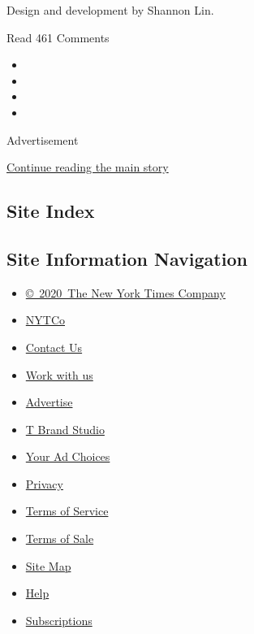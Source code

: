 Design and development by Shannon Lin.

Read 461 Comments

\begin{itemize}
\item
\item
\item
\item
\end{itemize}

Advertisement

\protect\hyperlink{after-bottom}{Continue reading the main story}

\hypertarget{site-index}{%
\subsection{Site Index}\label{site-index}}

\hypertarget{site-information-navigation}{%
\subsection{Site Information
Navigation}\label{site-information-navigation}}

\begin{itemize}
\tightlist
\item
  \href{https://help.nytimes.com/hc/en-us/articles/115014792127-Copyright-notice}{©~2020~The
  New York Times Company}
\end{itemize}

\begin{itemize}
\tightlist
\item
  \href{https://www.nytco.com/}{NYTCo}
\item
  \href{https://help.nytimes.com/hc/en-us/articles/115015385887-Contact-Us}{Contact
  Us}
\item
  \href{https://www.nytco.com/careers/}{Work with us}
\item
  \href{https://nytmediakit.com/}{Advertise}
\item
  \href{http://www.tbrandstudio.com/}{T Brand Studio}
\item
  \href{https://www.nytimes.com/privacy/cookie-policy\#how-do-i-manage-trackers}{Your
  Ad Choices}
\item
  \href{https://www.nytimes.com/privacy}{Privacy}
\item
  \href{https://help.nytimes.com/hc/en-us/articles/115014893428-Terms-of-service}{Terms
  of Service}
\item
  \href{https://help.nytimes.com/hc/en-us/articles/115014893968-Terms-of-sale}{Terms
  of Sale}
\item
  \href{https://spiderbites.nytimes.com}{Site Map}
\item
  \href{https://help.nytimes.com/hc/en-us}{Help}
\item
  \href{https://www.nytimes.com/subscription?campaignId=37WXW}{Subscriptions}
\end{itemize}
